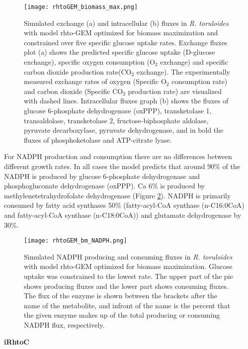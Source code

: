 \begin{figure}[H]
    \centering
    \texttt{[image: rhtoGEM\_biomass\_max.png]}
    \caption{Simulated exchange (a) and intracellular (b) fluxes in \textit{R. toruloides} with model rhto-GEM optimized for biomass maximization and constrained over five specific glucose uptake rates. Exchange fluxes plot (a) shows the predicted specific glucose uptake (D-glucose exchange), specific oxygen consumption (O$_2$ exchange) and specific carbon dioxide production rate(CO$_2$ exchange). The experimentally measured exchange rates of oxygen (Specific O$_2$ consumption rate) and carbon dioxide (Specific CO$_2$ production rate) are visualized with dashed lines. Intracellular fluxes graph (b) shows the fluxes of glucose 6-phosphate dehydrogenase (oxPPP), transketolase 1, transaldolase, transketolase 2, fructose-biphosphate aldolase, pyruvate decarboxylase, pyruvate dehydrogenase, and in bold the fluxes of phosphoketolase and ATP-citrate lyase.}
    \label{rhto-GEM biomass max}
\end{figure}

For NADPH production and consumption there are no differences 
between different growth rates. In all cases the model predicts that around $90\%$ of the NADPH is produced by glucose 6-phosphate dehydrogenase and
phosphogluconate dehydrogenase (oxPPP). Ca $6\%$ is produced by methylenetetrahydrofolate dehydrogenase (Figure \ref{fig:rhtoGEM_bm_NADPH}). NADPH is primarily consumed by fatty acid synthases 50\% (fatty-acyl-CoA synthase (n-C16:0CoA) and fatty-acyl-CoA synthase (n-C18:0CoA)) and glutamate dehydrogenase by 30\%.  
\begin{figure}[H]
    \centering
    \texttt{[image: rhtoGEM\_bm\_NADPH.png]}
    \caption{Simulated NADPH producing and consuming fluxes in \textit{R. toruloides} with model rhto-GEM optimized for biomass maximization. Glucose uptake was constrained 
    to the lowest rate. The upper part of the pie shows producing fluxes and the lower part shows consuming fluxes.
    The flux of the enzyme is shown between the brackets after the name of the metabolite, and infront of the name is the percent
    that the given enzyme makes up of the total producing or consuming NADPH flux, respectively.}
    \label{fig:rhtoGEM_bm_NADPH}
\end{figure}



\textbf{iRhtoC}

